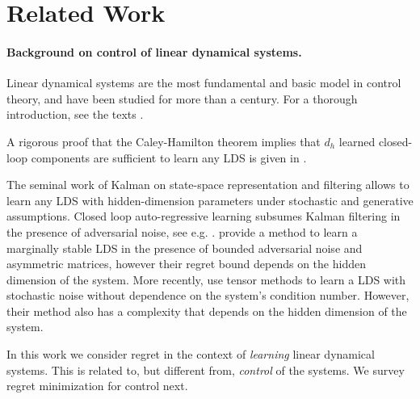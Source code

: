 \section{Related Work}
\paragraph{Background on control of linear dynamical systems.} 
Linear dynamical systems are the most fundamental and basic model in control theory, and have been studied for more than a century. For a thorough introduction, see the texts \cite{bertsekas2007dynamic,kemin,hazan2022introduction}. 

A rigorous proof that the Caley-Hamilton theorem implies that $d_h$ learned closed-loop components are sufficient to learn any LDS is given in  \cite{agarwal2023spectral,hazan2018spectral}. 


The seminal work of Kalman on state-space representation and filtering \cite{kalman1960new} allows to learn any LDS with hidden-dimension parameters under stochastic and generative assumptions. Closed loop auto-regressive learning subsumes Kalman filtering in the presence of adversarial noise, see e.g. \cite{kozdoba2019line}. \citet{ghai2020no} provide a method to learn a marginally stable LDS in the presence of bounded adversarial noise and asymmetric matrices, however their regret bound depends on the hidden dimension of the system. More recently, \cite{bakshi2023new} use tensor methods to learn a LDS with stochastic noise without dependence on the system's condition number. However, their method also has a complexity that depends on the hidden dimension of the system. 


In this work we consider regret in the context of {\it learning} linear dynamical systems. This is related to, but different from, {\it control} of the systems. We survey regret minimization for control next. 

